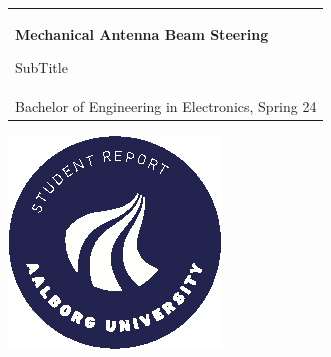 %
\begin{titlepage}
\vspace*{\fill}
  \noindent%
  {\color{white}\colorbox{aaublue}{\begin{tabular}{@{}p{\textwidth}@{}}
    \begin{center}
    \Huge{\textbf{
      Mechanical Antenna Beam Steering%
    }}
    \end{center}
    \begin{center}
      \Large{
        SubTitle  %
      }
    \end{center}
    \vspace{0.2cm}
   \begin{center}
    {\Large
      Rikke Udengaard%
    }\\
    \vspace{0.2cm}
    {\large
      Bachelor of Engineering in Electronics, Spring 24%
    }
   \end{center}
   \vspace{0.2cm}
   \begin{center}
    {\Large
      Fifth Semester Project
    }
   \end{center}
  \end{tabular}}}
  \vfill
  \begin{center}
    \includegraphics[width=0.2\paperwidth]{images/aau_logo_circle_en.eps}%
  \end{center}
\end{titlepage}
\clearpage
{}